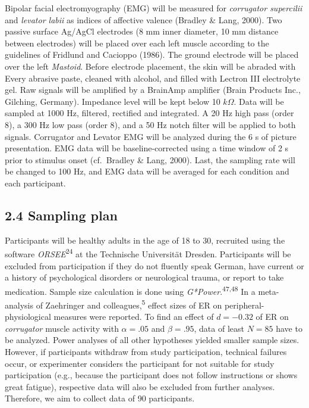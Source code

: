 \documentclass[
  english,
  man,floatsintext]{apa6}
\begin{document}
Bipolar facial electromyography (EMG) will be measured for \emph{corrugator supercilii} and \emph{levator labii} as indices of affective valence (Bradley \& Lang, 2000).
Two passive surface Ag/AgCl electrodes (8 mm inner diameter, 10 mm distance between electrodes) will be placed over each left muscle according to the guidelines of Fridlund and Cacioppo (1986).
The ground electrode will be placed over the left \emph{Mastoid}.
Before electrode placement, the skin will be abraded with Every abrasive paste, cleaned with alcohol, and filled with Lectron III electrolyte gel.
Raw signals will be amplified by a BrainAmp amplifier (Brain Products Inc., Gilching, Germany).
Impedance level will be kept below 10 \(k\Omega\).
Data will be sampled at 1000 Hz, filtered, rectified and integrated.
A 20 Hz high pass (order 8), a 300 Hz low pass (order 8), and a 50 Hz notch filter will be applied to both signals.
Corrugator and Levator EMG will be analyzed during the 6 s of picture presentation.
EMG data will be baseline-corrected using a time window of 2 s prior to stimulus onset (cf.~Bradley \& Lang, 2000).
Last, the sampling rate will be changed to 100 Hz, and EMG data will be averaged for each condition and each participant.

\hypertarget{sampling-plan}{%
\subsection{2.4 Sampling plan}\label{sampling-plan}}

Participants will be healthy adults in the age of 18 to 30, recruited using the software \emph{ORSEE}\textsuperscript{24} at the Technische Universität Dresden.
Participants will be excluded from participation if they do not fluently speak German, have current or a history of psychological disorders or neurological trauma, or report to take medication.
Sample size calculation is done using \emph{G*Power}.\textsuperscript{47,48}
In a meta-analysis of Zaehringer and colleagues,\textsuperscript{5} effect sizes of ER on peripheral-physiological measures were reported.
To find an effect of \(d=-0.32\) of ER on \emph{corrugator} muscle activity with \(\alpha=.05\) and \(\beta=.95\), data of least \(N=85\) have to be analyzed.
Power analyses of all other hypotheses yielded smaller sample sizes.
However, if participants withdraw from study participation, technical failures occur, or experimenter considers the participant for not suitable for study participation (e.g., because the participant does not follow instructions or shows great fatigue), respective data will also be excluded from further analyses.
Therefore, we aim to collect data of 90 participants.
\end{document}
